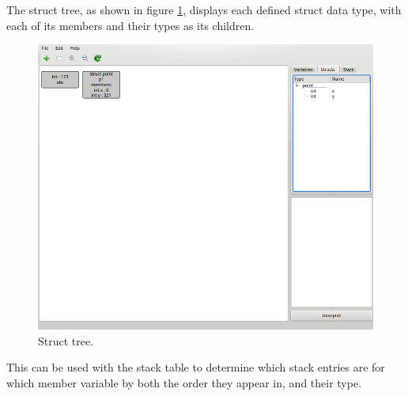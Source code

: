 \documentclass[a4paper,11pt]{article}
\begin{document}
The struct tree, as shown in figure \ref{fig:structtree1}, displays each defined struct data type, with each of its members and their types as its children.
\begin{figure}[h!]
\centering
\includegraphics[trim=460 300 0 35,clip]{structtree1}
\caption{Struct tree.}
\label{fig:structtree1}
\end{figure}
This can be used with the stack table to determine which stack entries are for which member variable by both the order they appear in, and their type.
\end{document}
